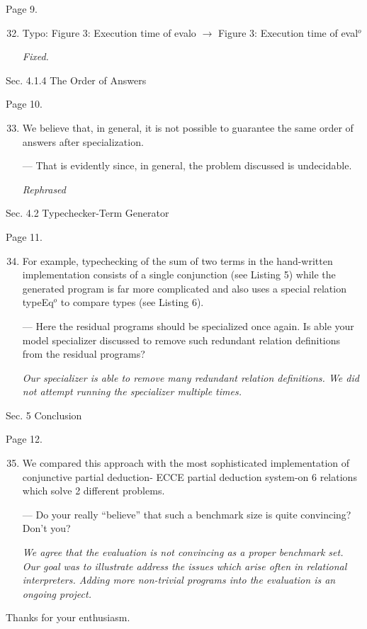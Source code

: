 Page 9.

\begin{enumerate}
  \setcounter{enumi}{31}
  \item {Typo:
  Figure 3: Execution time of evalo $\to$ Figure 3: Execution time of eval$^o$

  \emph{Fixed.}
  }
\end{enumerate}

Sec. 4.1.4 The Order of Answers

Page 10.

\begin{enumerate}
  \setcounter{enumi}{32}
  \item We believe that, in general, it is not possible to guarantee the same order of answers after specialization.

  --- That is evidently since, in general, the problem discussed is undecidable.

  \emph{Rephrased}
\end{enumerate}

Sec. 4.2 Typechecker-Term Generator

Page 11.

\begin{enumerate}
  \setcounter{enumi}{33}
  \item For example, typechecking of the sum of two terms in the hand-written implementation consists of a single conjunction (see Listing 5) while the generated program is far more complicated and also uses a special relation typeEq$^o$ to compare types (see Listing 6).

  --- Here the residual programs should be specialized once again. Is able your model specializer discussed to remove such redundant relation definitions from the residual programs?

  \emph{Our specializer is able to remove many redundant relation definitions. We did not attempt running the specializer multiple times. }
\end{enumerate}

Sec. 5 Conclusion

Page 12.

\begin{enumerate}
  \setcounter{enumi}{34}
  \item We compared this approach with the most sophisticated implementation of conjunctive partial deduction- ECCE partial deduction system-on 6 relations which solve 2 different problems.

  --- Do your really ``believe'' that such a benchmark size is quite convincing? Don't you?

  \emph{We agree that the evaluation is not convincing as a proper benchmark set. Our goal was to illustrate address the issues which arise often in relational interpreters. Adding more non-trivial programs into the evaluation is an ongoing project.}
\end{enumerate}

Thanks for your enthusiasm.

